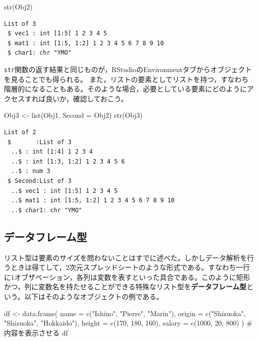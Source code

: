 \documentclass[
  a4paper,
]{ltjsbook}
\newenvironment{Shaded}{\begin{snugshade}}{\end{snugshade}}
\newcommand{\AttributeTok}[1]{\textcolor[rgb]{0.40,0.45,0.13}{#1}}
\newcommand{\CommentTok}[1]{\textcolor[rgb]{0.37,0.37,0.37}{#1}}
\newcommand{\DecValTok}[1]{\textcolor[rgb]{0.68,0.00,0.00}{#1}}
\newcommand{\FunctionTok}[1]{\textcolor[rgb]{0.28,0.35,0.67}{#1}}
\newcommand{\NormalTok}[1]{\textcolor[rgb]{0.00,0.23,0.31}{#1}}
\newcommand{\OtherTok}[1]{\textcolor[rgb]{0.00,0.23,0.31}{#1}}
\newcommand{\StringTok}[1]{\textcolor[rgb]{0.13,0.47,0.30}{#1}}
\begin{document}
\begin{Shaded}
\begin{Highlighting}[]
\FunctionTok{str}\NormalTok{(Obj2)}
\end{Highlighting}
\end{Shaded}

\begin{verbatim}
List of 3
 $ vec1 : int [1:5] 1 2 3 4 5
 $ mat1 : int [1:5, 1:2] 1 2 3 4 5 6 7 8 9 10
 $ char1: chr "YMO"
\end{verbatim}

\texttt{str}関数の返す結果と同じものが，RStudioのEnvironmentタブからオブジェクトを見ることでも得られる。
また，リストの要素としてリストを持つ，すなわち階層的になることもある。そのような場合，必要としている要素にどのようにアクセスすれば良いか，確認しておこう。

\begin{Shaded}
\begin{Highlighting}[]
\NormalTok{Obj3 }\OtherTok{\textless{}{-}} \FunctionTok{list}\NormalTok{(Obj1, }\AttributeTok{Second =}\NormalTok{ Obj2)}
\FunctionTok{str}\NormalTok{(Obj3)}
\end{Highlighting}
\end{Shaded}

\begin{verbatim}
List of 2
 $       :List of 3
  ..$ : int [1:4] 1 2 3 4
  ..$ : int [1:3, 1:2] 1 2 3 4 5 6
  ..$ : num 3
 $ Second:List of 3
  ..$ vec1 : int [1:5] 1 2 3 4 5
  ..$ mat1 : int [1:5, 1:2] 1 2 3 4 5 6 7 8 9 10
  ..$ char1: chr "YMO"
\end{verbatim}

\subsection{データフレーム型}\label{ux30c7ux30fcux30bfux30d5ux30ecux30fcux30e0ux578b}

リスト型は要素のサイズを問わないことはすでに述べた。しかしデータ解析を行うときは得てして，2次元スプレッドシートのような形式である。すなわち一行に1オブザベーション，各列は変数を表すといった具合である。このように矩形かつ，列に変数名を持たせることができる特殊なリスト型を\textbf{データフレーム型}という。以下はそのようなオブジェクトの例である。

\begin{Shaded}
\begin{Highlighting}[]
\NormalTok{df }\OtherTok{\textless{}{-}} \FunctionTok{data.frame}\NormalTok{(}
  \AttributeTok{name =} \FunctionTok{c}\NormalTok{(}\StringTok{"Ishino"}\NormalTok{, }\StringTok{"Pierre"}\NormalTok{, }\StringTok{"Marin"}\NormalTok{),}
  \AttributeTok{origin =} \FunctionTok{c}\NormalTok{(}\StringTok{"Shizuoka"}\NormalTok{, }\StringTok{"Shizuoka"}\NormalTok{, }\StringTok{"Hokkaido"}\NormalTok{),}
  \AttributeTok{height =} \FunctionTok{c}\NormalTok{(}\DecValTok{170}\NormalTok{, }\DecValTok{180}\NormalTok{, }\DecValTok{160}\NormalTok{),}
  \AttributeTok{salary =} \FunctionTok{c}\NormalTok{(}\DecValTok{1000}\NormalTok{, }\DecValTok{20}\NormalTok{, }\DecValTok{800}\NormalTok{)}
\NormalTok{)}
\CommentTok{\# 内容を表示させる}
\NormalTok{df}
\end{Highlighting}
\end{Shaded}
\end{document}

